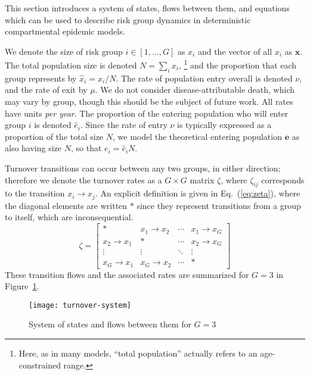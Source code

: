 This section introduces a system of states, flows between them, and equations
which can be used to describe risk group dynamics
in deterministic compartmental epidemic models.
\par
We denote the size of risk group $i \in [1, \dots, G]$ as $x_i$
and the vector of all $x_i$ as $\bm{x}$.
The total population size is denoted $N = \sum_i {x_i}$,%
\footnote{Here, as in many models, ``total population'' actually refers to
  an age-constrained range.}
and the proportion that each group represents by $\hat{x}_i = x_i / N$.
The rate of population entry overall is denoted $\nu$,
and the rate of exit by $\mu$.
We do not consider disease-attributable death, which may vary by group,
though this should be the subject of future work.
All rates have units \textit{per year}.
The proportion of the entering population who will enter group $i$
is denoted $\hat{e}_i$.
Since the rate of entry $\nu$ is typically expressed as
a proportion of the total size $N$,
we model the theoretical entering population $\bm{e}$ as also having size $N$,
so that $e_i = \hat{e}_i N$.
\par
Turnover transitions can occur between any two groups, in either direction;
therefore we denote the turnover rates as a $G \times G$ matrix $\zeta$,
where $\zeta_{ij}$ corresponds to the transition $x_i \rightarrow x_j$.
An explicit definition is given in Eq.~(\ref{eq:zeta}),
where the diagonal elements are written $*$ since they represent
transitions from a group to itself, which are inconsequential.
\begin{equation}\label{eq:zeta}
\zeta = \left[\begin{array}{cccc}
	         *          & x_1  \rightarrow x_2 & \cdots & x_1 \rightarrow x_G \\[0.5em]
	x_2 \rightarrow x_1 &          *           & \cdots & x_2 \rightarrow x_G \\[0.5em]
	      \vdots        &        \vdots        & \ddots &       \vdots        \\[0.5em]
	x_G \rightarrow x_1 & x_G \rightarrow x_2  & \cdots &          *
\end{array}\right]
\end{equation}
These transition flows and the associated rates
are summarized for $G = 3$ in Figure~\ref{fig:system}.
\begin{figure}
  \centering
  \texttt{[image: turnover-system]}
  \caption{System of states and flows between them for $G = 3$}
  \label{fig:system}
\end{figure}
